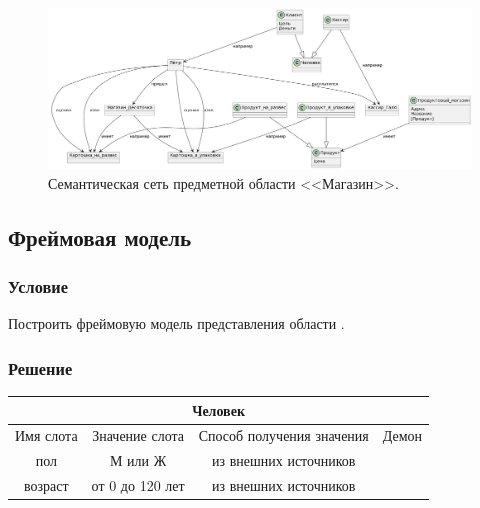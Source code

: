 \documentclass[14pt, a4paper, titlepage]{extarticle}
\begin{document}
\begin{figure}[H]
	\includegraphics[width=\textwidth]{pic2}
	\caption{Семантическая сеть предметной области <<Магазин>>.}
\end{figure}

\subsection{Фреймовая модель}

\subsubsection*{Условие}

Построить фреймовую модель представления области .

\subsubsection*{Решение}

\begin{table}[H]
\begin{adjustbox}{width=\columnwidth,center}
\begin{tabular}{cccc}
	\toprule
	\multicolumn{4}{c}{Человек} \\
	\midrule
	Имя слота & Значение слота & Способ получения значения & Демон
	\\\midrule
	
	пол & М или Ж & из внешних источников & \\
	возраст & от 0 до 120 лет & из внешних источников & \\
	
	\bottomrule
\end{tabular}
\end{adjustbox}
\end{table}
\end{document}
